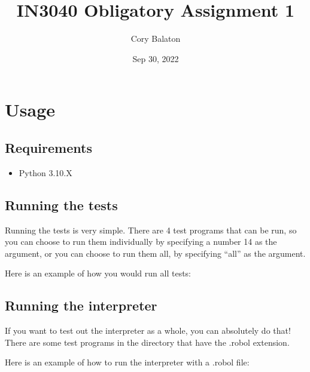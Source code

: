 \documentclass[letterpaper,10pt,english]{sphinxmanual}
\title{IN3040 Obligatory Assignment 1}
\date{Sep 30, 2022}
\author{Cory Balaton}
\begin{document}
\pagestyle{empty}
\sphinxmaketitle
\pagestyle{plain}
\sphinxtableofcontents
\pagestyle{normal}
\label{\detokenize{index::doc}}



\chapter{Usage}
\label{\detokenize{usage:usage}}\label{\detokenize{usage::doc}}

\section{Requirements}
\label{\detokenize{usage:requirements}}\begin{itemize}
\item {} 
\sphinxAtStartPar
Python 3.10.X

\end{itemize}


\section{Running the tests}
\label{\detokenize{usage:running-the-tests}}
\sphinxAtStartPar
Running the tests is very simple. There are 4 test programs that can be run, so you can choose to run them individually by specifying a number 1\sphinxhyphen{}4 as the argument, or you can choose to run them all, by specifying “all” as the argument.

\sphinxAtStartPar
Here is an example of how you would run all tests:

\begin{sphinxVerbatim}[commandchars=\\\{\}]
  
\end{sphinxVerbatim}


\section{Running the interpreter}
\label{\detokenize{usage:running-the-interpreter}}
\sphinxAtStartPar
If you want to test out the interpreter as a whole, you can absolutely do that!
There are some test programs in the  directory that have the .robol extension.

\sphinxAtStartPar
Here is an example of how to run the interpreter with a .robol file:

\begin{sphinxVerbatim}[commandchars=\\\{\}]
 
\end{sphinxVerbatim}
\end{document}
